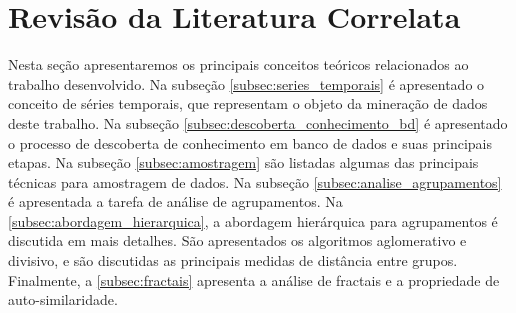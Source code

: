 \section{Revisão da Literatura Correlata} \label{sec:fundamentacao_teorica}

Nesta seção apresentaremos os principais conceitos teóricos relacionados ao
trabalho desenvolvido. Na subseção \ref{subsec:series_temporais} é apresentado
o conceito de séries temporais, que representam o objeto da mineração de dados
deste trabalho. Na subseção \ref{subsec:descoberta_conhecimento_bd} é
apresentado o processo de descoberta de conhecimento em banco de dados e
suas principais etapas. Na subseção \ref{subsec:amostragem} são listadas
algumas das principais técnicas para amostragem de dados. Na subseção
\ref{subsec:analise_agrupamentos} é apresentada a tarefa de análise de
agrupamentos. Na \ref{subsec:abordagem_hierarquica}, a abordagem hierárquica
para agrupamentos é discutida em mais detalhes. São apresentados os algoritmos
aglomerativo e divisivo, e são discutidas as principais medidas de distância
entre grupos. Finalmente, a \ref{subsec:fractais} apresenta a análise de 
fractais e a propriedade de auto-similaridade.










